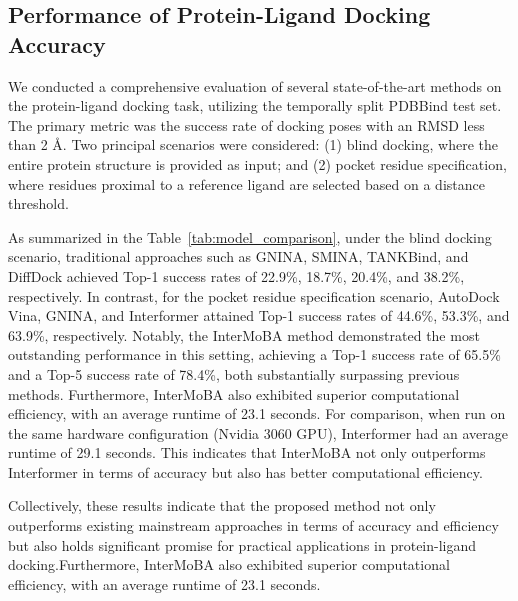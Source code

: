 \documentclass[lettersize,journal]{IEEEtran}
\begin{document}
\subsection{Performance of Protein-Ligand Docking Accuracy}
We conducted a comprehensive evaluation of several state-of-the-art methods on the protein-ligand docking task, utilizing the temporally split PDBBind test set\cite{corso2022diffdock}. The primary metric was the success rate of docking poses with an RMSD less than 2 \AA. Two principal scenarios were considered: (1) blind docking, where the entire protein structure is provided as input; and (2) pocket residue specification, where residues proximal to a reference ligand are selected based on a distance threshold.

As summarized in the Table~\ref{tab:model_comparison}, under the blind docking scenario, traditional approaches such as GNINA\cite{mcnutt2021gnina}, SMINA\cite{koes2013lessons}, TANKBind\cite{lu2022tankbind}, and DiffDock\cite{corso2022diffdock} achieved Top-1 success rates of 22.9\%, 18.7\%, 20.4\%, and 38.2\%, respectively. In contrast, for the pocket residue specification scenario, AutoDock Vina\cite{trott2010autodock}, GNINA, and Interformer\cite{lai2024interformer} attained Top-1\cite{jain2024deep} success rates of 44.6\%, 53.3\%, and 63.9\%, respectively. Notably, the InterMoBA method demonstrated the most outstanding performance in this setting, achieving a Top-1 success rate of 65.5\% and a Top-5 success rate of 78.4\%, both substantially surpassing previous methods. Furthermore, InterMoBA also exhibited superior computational efficiency, with an average runtime of 23.1 seconds. For comparison, when run on the same hardware configuration (Nvidia 3060 GPU), Interformer had an average runtime of 29.1 seconds. This indicates that InterMoBA not only outperforms Interformer in terms of accuracy but also has better computational efficiency.

Collectively, these results indicate that the proposed method not only outperforms existing mainstream approaches in terms of accuracy and efficiency but also holds significant promise for practical applications in protein-ligand docking.Furthermore, InterMoBA also exhibited superior computational efficiency, with an average runtime of 23.1 seconds.
\end{document}
